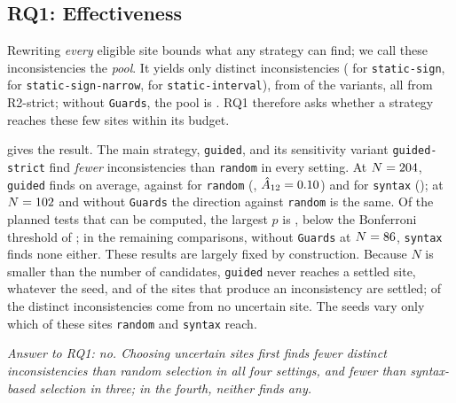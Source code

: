 \subsection{RQ1: Effectiveness}
\label{sec:rq1}
Rewriting \emph{every} eligible site bounds what any strategy can find; we
call these inconsistencies the \emph{pool}. It yields only \Pool{} distinct inconsistencies (\PoolSign{} for
\texttt{static-sign}, \PoolSignNarrow{} for \texttt{static-sign-narrow},
\PoolInterval{} for \texttt{static-interval}), from \NumInconsistentVariants{}
of the \NumValid{} variants, all from R2-strict; without \texttt{Guards}, the
pool is \PoolNoGuards{}. RQ1 therefore asks whether a strategy reaches these
few sites within its budget.

\begin{table}[t]
\caption{RQ1: distinct inconsistencies per run at the 50\% budget, mean
(population standard deviation) over \NumSeeds{} seeds, per analyzer and in total, with
the Mann--Whitney $p$ and $\hat{A}_{12}$ of the total against
\texttt{random}. $^\dagger$Exploratory, defined after the pool was known.}
\label{tab:rq1}
\small

\end{table}

 gives the result. The main strategy,
\texttt{guided}, and its sensitivity variant \texttt{guided-strict} find
\emph{fewer} inconsistencies than \texttt{random} in every setting. At $N=204$,
\texttt{guided} finds \MeanGuidedHalf{} on average, against \MeanRandomHalf{}
for \texttt{random} (\PGuidedRandomHalf, $\hat{A}_{12}=0.10$) and
\MeanSyntaxHalf{} for \texttt{syntax} (\PGuidedSyntaxHalf); at
$N=102$ and without \texttt{Guards} the direction against
\texttt{random} is the same. Of
the \NumPlannedTests{} planned tests that can be computed, the largest $p$ is
\MaxPlannedP{}, below the Bonferroni threshold of \BonferroniAlpha{}; in the
\NumPlannedNoTest{} remaining comparisons, without \texttt{Guards} at
$N=86$, \texttt{syntax} finds none either. These results
are largely fixed by construction. Because $N$ is smaller than the number of
candidates, \texttt{guided} never reaches a settled site, whatever the seed,
and \NumInconsistentSitesSettled{} of the \NumInconsistentVariants{} sites
that produce an inconsistency are settled; \PoolFromSettledOnly{} of the
\Pool{} distinct inconsistencies come from no uncertain site. The seeds vary
only which of these sites \texttt{random} and \texttt{syntax} reach.

\emph{Answer to RQ1: no. Choosing uncertain sites first finds fewer distinct
inconsistencies than random selection in all four settings, and fewer than
syntax-based selection in three; in the fourth, neither finds any.}

